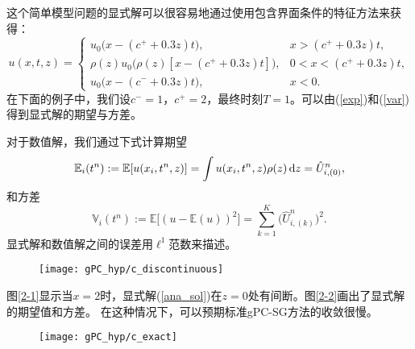 这个简单模型问题的显式解可以很容易地通过使用包含界面条件的特征方法来获得：
\begin{equation}\label{ana_sol}
  u(x, t, z)=   
  \begin{cases}
    u_0\big(x - (c^+ + 0.3z)t\big), \quad &x > (c^+ + 0.3z)t,\\
    \rho(z) u_0\big(\rho(z)[x - (c^+ + 0.3z)t]\big), &0 < x < (c^+ + 0.3z)t,\\
    u_0\big(x - (c^- + 0.3z)t\big),  &x < 0.
  \end{cases}
\end{equation}
在下面的例子中，我们设$c^- = 1$，$c^+ = 2$，最终时刻$T = 1$。可以由(\ref{exp})和(\ref{var})得到显式解的期望与方差。

对于数值解，我们通过下式计算期望
\begin{equation*}
  \mathbb{E}_i(t^n):=\mathbb{E}[u(x_i,t^n,z)]=\int u(x_i,t^n,z)\rho(z)\mathop{}\!\mathrm{d} z = \hat{U}^n_{i,(0)}, 
\end{equation*}
和方差
\begin{equation*}
  \mathbb{V}_i(t^n):=\mathbb{E}\big[(u-\mathbb{E}(u))^2\big] = \sum_{k=1}^K \big(\hat{U}^n_{i,(k)}\big)^2.
\end{equation*}
显式解和数值解之间的误差用$\ell^1$范数来描述。

\begin{figure}[htbp]
  \centering
  \texttt{[image: gPC\_hyp/c\_discontinuous]}
\end{figure}
图\ref{2-1}显示当$x = 2$时，显式解(\ref{ana_sol})在$z = 0$处有间断。图\ref{2-2}画出了显式解的期望值和方差。 在这种情况下，可以预期标准gPC-SG方法的收敛很慢。 
\begin{figure}[htbp]
  \centering
  \texttt{[image: gPC\_hyp/c\_exact]}
\end{figure}


